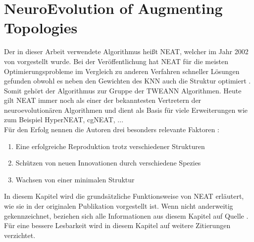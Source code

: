 \section{NeuroEvolution of Augmenting Topologies}
Der in dieser Arbeit verwendete Algorithmus heißt \ac{NEAT}, welcher im Jahr 2002 von \citeauthor{stanley2002evolving} vorgestellt wurde. Bei der Veröffentlichung hat \ac{NEAT} für die meisten Optimierungsprobleme im Vergleich zu anderen Verfahren schneller Lösungen gefunden obwohl es neben den Gewichten des \ac{KNN} auch die Struktur optimiert \cite{stanley2002evolving}. Somit gehört der Algorithmus zur Gruppe der \ac{TWEANN} Algorithmen. Heute gilt \ac{NEAT} immer noch als einer der bekanntesten Vertretern der neuroevolutionären Algorithmen und dient als Basis für viele Erweiterungen wie zum Beispiel HyperNEAT, cgNEAT, ... \\
Für den Erfolg nennen die Autoren drei besonders relevante Faktoren \cite{stanley2002evolving}:
\begin{enumerate}
	\item Eine erfolgreiche Reproduktion trotz verschiedener Strukturen
	\item Schützen von neuen Innovationen durch verschiedene Spezies
	\item Wachsen von einer minimalen Struktur
\end{enumerate}
In diesem Kapitel wird die grundsätzliche Funktionsweise von \ac{NEAT} erläutert, wie sie in der originalen Publikation vorgestellt ist. Wenn nicht anderweitig gekennzeichnet, beziehen sich alle Informationen aus diesem Kapitel auf Quelle \cite{stanley2002evolving}. Für eine bessere Lesbarkeit wird in diesem Kapitel auf weitere Zitierungen verzichtet.
